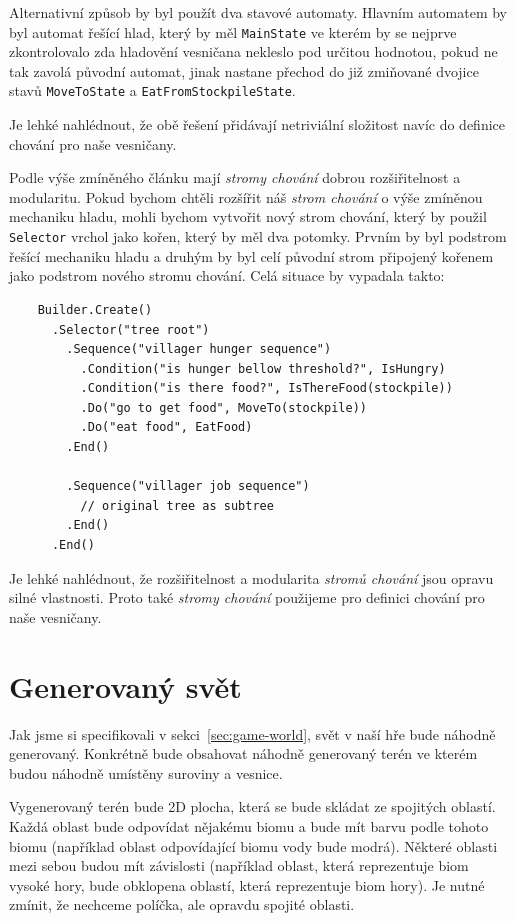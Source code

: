 Alternativní způsob by byl použít dva stavové automaty. Hlavním automatem by byl automat řešící hlad, který by měl \texttt{MainState} ve kterém by se nejprve zkontrolovalo zda hladovění vesničana nekleslo pod určitou hodnotou, pokud ne tak zavolá původní automat, jinak nastane přechod do již zmiňované dvojice stavů \texttt{MoveToState} a \texttt{EatFromStockpileState}.

Je lehké nahlédnout, že obě řešení přidávají netriviální složitost navíc do definice chování pro naše vesničany.

Podle výše zmíněného článku mají \textit{stromy chování} dobrou rozšiřitelnost a modularitu. Pokud bychom chtěli rozšířit náš \textit{strom chování} o výše zmíněnou mechaniku hladu, mohli bychom vytvořit nový strom chování, který by použil \texttt{Selector} vrchol jako kořen, který by měl dva potomky. Prvním by byl podstrom řešící mechaniku hladu a druhým by byl celí původní strom připojený kořenem jako podstrom nového stromu chování. Celá situace by vypadala takto:

\begin{verbatim}
    Builder.Create()
      .Selector("tree root")
        .Sequence("villager hunger sequence")
          .Condition("is hunger bellow threshold?", IsHungry)
          .Condition("is there food?", IsThereFood(stockpile))
          .Do("go to get food", MoveTo(stockpile))
          .Do("eat food", EatFood)
        .End()

        .Sequence("villager job sequence")
          // original tree as subtree
        .End()
      .End()
\end{verbatim}

Je lehké nahlédnout, že rozšiřitelnost a modularita \textit{stromů chování} jsou opravu silné vlastnosti. Proto také \textit{stromy chování} použijeme pro definici chování pro naše vesničany.


\section{Generovaný svět}
\label{sec:terrain}
Jak jsme si specifikovali v sekci~\ref{sec:game-world}, svět v naší hře bude náhodně generovaný. Konkrétně bude obsahovat náhodně generovaný terén ve kterém budou náhodně umístěny suroviny a vesnice.

Vygenerovaný terén bude 2D plocha, která se bude skládat ze spojitých oblastí. Každá oblast bude odpovídat nějakému biomu a bude mít barvu podle tohoto biomu (například oblast odpovídající biomu vody bude modrá). Některé oblasti mezi sebou budou mít závislosti (například oblast, která reprezentuje biom vysoké hory, bude obklopena oblastí, která reprezentuje biom hory). Je nutné zmínit, že nechceme políčka, ale opravdu spojité oblasti.

